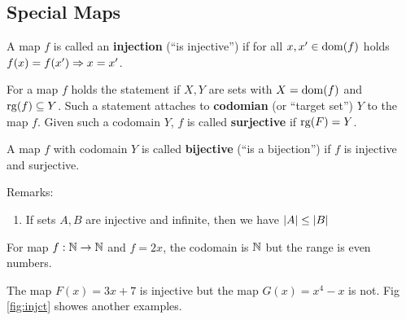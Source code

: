 \documentclass[12pt]{book}
\begin{document}
\subsection{Special Maps}
\label{sec:Specialmaps}

\begin{defi}\label{def:inj}
      A map $f$ is called an \textbf{injection} (``is injective'') if for all $x, x' \in \operatorname{dom}(f)$ holds $f(x) = f(x') \Rightarrow x = x'$.
\end{defi}
\begin{defi}\label{def:surj}
      For a map $f$ holds the statement  if $X, Y$ are sets with $X = \operatorname{dom}(f)$ and $\operatorname{rg}(f) \subseteq Y$. Such a statement attaches to 
	  \textbf{codomian} (or ``target set'') $Y$ to the map $f$. Given such a codomain $Y$, $f$ is called \textbf{surjective} if $\operatorname{rg}(F) = Y$.
\end{defi}
\begin{defi}\label{def:bij}
      A map $f$ with codomain $Y$ is called \textbf{bijective} (``is a bijection'') if $f$ is injective and surjective.
\end{defi}
Remarks:
\begin{enumerate}
      \item If sets $A , B$ are injective and infinite, then we have $\lvert A \rvert \leq \lvert B \rvert$
\end{enumerate}
\begin{examp}\label{exp:Specialmaps}
      For map $f: \mathbb{N} \to \mathbb{N}$ and $f=2x$, the codomain is $\mathbb{N}$ but the range is even numbers.
\end{examp}
\begin{examp}\label{exp:Specialmaps}
      The map $F(x) = 3 x + 7$ is injective but the map $G(x) = x^4 - x$ is not. Fig \ref{fig:injct} showes another examples.
\end{examp}
\end{document}
